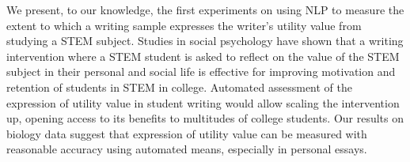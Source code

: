 We present, to our knowledge, the first experiments on using NLP  to measure the extent to which a writing sample expresses the writer's utility value from studying a STEM subject. Studies in social psychology have shown that a writing intervention where a STEM student is asked to reflect on the value of the STEM subject in their personal and social life is effective for improving motivation and retention of students in STEM  in college. Automated assessment of the expression of utility value  in student writing would allow scaling the intervention up, opening access to its benefits to multitudes of  college students. Our results on biology data suggest that expression of utility value can be measured with reasonable accuracy using automated means, especially in personal essays.
